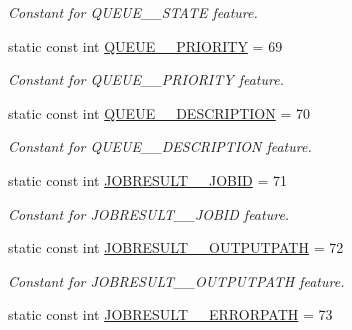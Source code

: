 \begin{DoxyCompactItemize}
\begin{DoxyCompactList}\small\item\em Constant for QUEUE\_\-\_\-STATE feature. \item\end{DoxyCompactList}\item 
\hypertarget{classTMS__Data_1_1TMS__DataPackage_ae3da013c8fc6ed3644ce70c722ab14e6}{
static const int \hyperlink{classTMS__Data_1_1TMS__DataPackage_ae3da013c8fc6ed3644ce70c722ab14e6}{QUEUE\_\-\_\-PRIORITY} = 69}
\label{classTMS__Data_1_1TMS__DataPackage_ae3da013c8fc6ed3644ce70c722ab14e6}

\begin{DoxyCompactList}\small\item\em Constant for QUEUE\_\-\_\-PRIORITY feature. \item\end{DoxyCompactList}\item 
\hypertarget{classTMS__Data_1_1TMS__DataPackage_a4c21986a87f6a35e2a2797381ccf14c1}{
static const int \hyperlink{classTMS__Data_1_1TMS__DataPackage_a4c21986a87f6a35e2a2797381ccf14c1}{QUEUE\_\-\_\-DESCRIPTION} = 70}
\label{classTMS__Data_1_1TMS__DataPackage_a4c21986a87f6a35e2a2797381ccf14c1}

\begin{DoxyCompactList}\small\item\em Constant for QUEUE\_\-\_\-DESCRIPTION feature. \item\end{DoxyCompactList}\item 
\hypertarget{classTMS__Data_1_1TMS__DataPackage_a7ce4559caf5f9dcb18af38d4e5bb3e8b}{
static const int \hyperlink{classTMS__Data_1_1TMS__DataPackage_a7ce4559caf5f9dcb18af38d4e5bb3e8b}{JOBRESULT\_\-\_\-JOBID} = 71}
\label{classTMS__Data_1_1TMS__DataPackage_a7ce4559caf5f9dcb18af38d4e5bb3e8b}

\begin{DoxyCompactList}\small\item\em Constant for JOBRESULT\_\-\_\-JOBID feature. \item\end{DoxyCompactList}\item 
\hypertarget{classTMS__Data_1_1TMS__DataPackage_aff74422d9eefa86ff53a504da236bff4}{
static const int \hyperlink{classTMS__Data_1_1TMS__DataPackage_aff74422d9eefa86ff53a504da236bff4}{JOBRESULT\_\-\_\-OUTPUTPATH} = 72}
\label{classTMS__Data_1_1TMS__DataPackage_aff74422d9eefa86ff53a504da236bff4}

\begin{DoxyCompactList}\small\item\em Constant for JOBRESULT\_\-\_\-OUTPUTPATH feature. \item\end{DoxyCompactList}\item 
\hypertarget{classTMS__Data_1_1TMS__DataPackage_a69aaa3601dfdb968aaf73725023bdc6f}{
static const int \hyperlink{classTMS__Data_1_1TMS__DataPackage_a69aaa3601dfdb968aaf73725023bdc6f}{JOBRESULT\_\-\_\-ERRORPATH} = 73}
\label{classTMS__Data_1_1TMS__DataPackage_a69aaa3601dfdb968aaf73725023bdc6f}


\end{DoxyCompactItemize}
